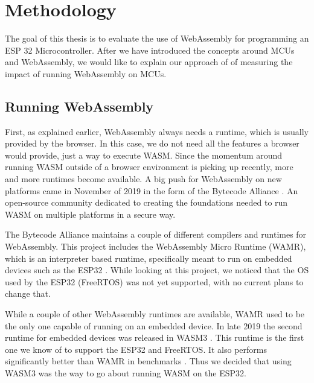 
\chapter{Methodology}\label{chapter:methodology}

The goal of this thesis is to evaluate the use of WebAssembly for programming an ESP 32 Microcontroller. After we have introduced the concepts around MCUs and WebAssembly, we would like to explain our approach of of measuring the impact of running WebAssembly on MCUs.

\section{Running WebAssembly}

First, as explained earlier, WebAssembly always needs a runtime, which is usually provided by the browser. In this case, we do not need all the features a browser would provide, just a way to execute WASM. Since the momentum around running WASM outside of a browser environment is picking up recently, more and more runtimes become available. A big push for WebAssembly on new platforms came in November of 2019 in the form of the Bytecode Alliance \autocite{noauthor_bytecode_nodate}. An open-source community dedicated to creating the foundations needed to run WASM on multiple platforms in a secure way.

The Bytecode Alliance maintains a couple of different compilers and runtimes for WebAssembly. This project includes the WebAssembly Micro Runtime (WAMR), which is an interpreter based runtime, specifically meant to run on embedded devices such as the ESP32 \autocite{noauthor_bytecodealliancewasm-micro-runtime_2020}. While looking at this project, we noticed that the OS used by the ESP32 (FreeRTOS) was not yet supported, with no current plans to change that.

While a couple of other WebAssembly runtimes are available, \autocite{akinyemi_appcypherawesome-wasm-runtimes_2020} WAMR used to be the only one capable of running on an embedded device. In late 2019 the second runtime for embedded devices was released in WASM3 \autocite{noauthor_wasm3wasm3_2020}. This runtime is the first one we know of to support the ESP32 and FreeRTOS. It also performs significantly better than WAMR in benchmarks \autocite{shymanskyy_wasm3_2020}. Thus we decided that using WASM3 was the way to go about running WASM on the ESP32.

